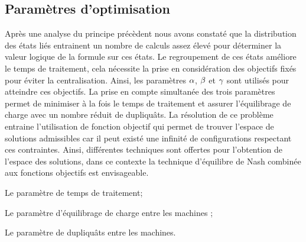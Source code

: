 
\subsection{Paramètres d’optimisation}
 
Après une analyse du principe précèdent nous avons constaté que la distribution des états liés entrainent un nombre de calculs assez élevé pour déterminer la valeur logique de la formule sur ces états. Le regroupement de ces états améliore le temps de traitement, cela nécessite la prise en considération des objectifs fixés pour éviter la centralisation. Ainsi, les paramètres $\parametreone{}$, $\parametretwo{}$ et $\parametretree{}$ sont utilisés pour atteindre ces objectifs. La prise en compte simultanée des trois paramètres permet de minimiser à la fois le temps de traitement et assurer l’équilibrage de charge avec un nombre réduit de dupliquâts. La résolution de ce problème entraine l'utilisation de fonction objectif qui permet de trouver l'espace de solutions admissibles car il peut existé une infinité de configurations respectant ces contraintes. Ainsi, différentes techniques sont offertes pour l'obtention de l'espace des solutions, dans ce contexte la technique d’équilibre de Nash combinée aux fonctions objectifs est envisageable.
\begin{description}[leftmargin=*,labelindent=1em]
	\item[$\parametreone{}$] Le paramètre de temps de traitement;
	\item [$\parametretwo{}$] Le paramètre d'équilibrage de charge entre les machines ;
	\item [$\parametretree{}$] Le paramètre de dupliquâts  entre les machines.
\end{description}


